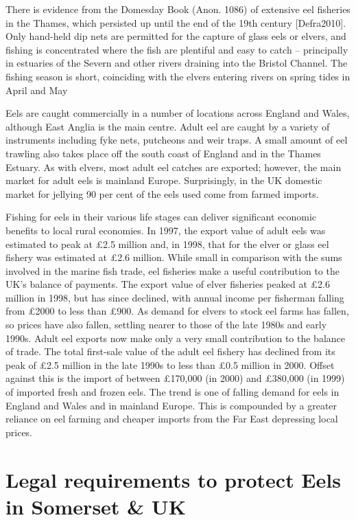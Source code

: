 \documentclass[]{article}
\begin{document}
There is evidence from the Domesday Book (Anon. 1086) of extensive eel
fisheries in the Thames, which persisted up until the end of the 19th
century {[}Defra2010{]}. Only hand-held dip nets are permitted for the
capture of glass eels or elvers, and fishing is concentrated where the
fish are plentiful and easy to catch -- principally in estuaries of the
Severn and other rivers draining into the Bristol Channel. The fishing
season is short, coinciding with the elvers entering rivers on spring
tides in April and May

Eels are caught commercially in a number of locations across England and
Wales, although East Anglia is the main centre. Adult eel are caught by
a variety of instruments including fyke nets, putcheons and weir traps.
A small amount of eel trawling also takes place off the south coast of
England and in the Thames Estuary. As with elvers, most adult eel
catches are exported; however, the main market for adult eels is
mainland Europe. Surprisingly, in the UK domestic market for jellying 90
per cent of the eels used come from farmed imports.

Fishing for eels in their various life stages can deliver significant
economic benefits to local rural economies. In 1997, the export value of
adult eels was estimated to peak at £2.5 million and, in 1998, that for
the elver or glass eel fishery was estimated at £2.6 million. While
small in comparison with the sums involved in the marine fish trade, eel
fisheries make a useful contribution to the UK's balance of payments.
The export value of elver fisheries peaked at £2.6 million in 1998, but
has since declined, with annual income per fisherman falling from £2000
to less than £900. As demand for elvers to stock eel farms has fallen,
so prices have also fallen, settling nearer to those of the late 1980s
and early 1990s. Adult eel exports now make only a very small
contribution to the balance of trade. The total first-sale value of the
adult eel fishery has declined from its peak of £2.5 million in the late
1990s to less than £0.5 million in 2000. Offset against this is the
import of between £170,000 (in 2000) and £380,000 (in 1999) of imported
fresh and frozen eels. The trend is one of falling demand for eels in
England and Wales and in mainland Europe. This is compounded by a
greater reliance on eel farming and cheaper imports from the Far East
depressing local prices.

\hypertarget{legal-requirements-to-protect-eels-in-somerset-uk}{%
\section{Legal requirements to protect Eels in Somerset \&
UK}\label{legal-requirements-to-protect-eels-in-somerset-uk}}
\end{document}
